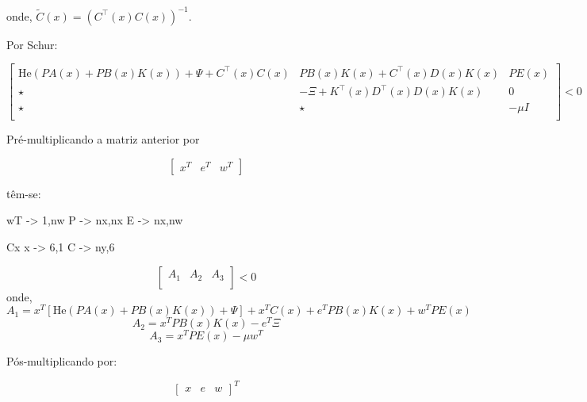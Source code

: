 onde, $\tilde C(x) = (C^{\top}(x) C(x))^{-1}$.

Por Schur:


\begin{equation}
  \begin{bmatrix}
    \text{He}(PA(x) + PB(x)K(x)) + \Psi  + C^{\top}(x) C(x) & PB(x)K(x) +  C^{\top}(x) D(x) K(x)       & P E(x) \\
    \star                                                   & -\Xi + K^{\top}(x) D^{\top}(x) D(x) K(x) & 0      \\
    \star                                                   & \star                                    & -\mu I \\
  \end{bmatrix} < 0
\end{equation}

Pré-multiplicando a matriz anterior por

\begin{equation}
  \begin{bmatrix}
    x^T & e^T & w^T
  \end{bmatrix}
\end{equation}

têm-se:

wT -> 1,nw
P -> nx,nx
E -> nx,nw


Cx
x -> 6,1
C -> ny,6

\begin{equation}
  \begin{bmatrix}
    A_1 & A_2 & A_3 \\
  \end{bmatrix} < 0
\end{equation}
onde,
\begin{equation}
  A_1 = x^T \left[\text{He}(PA(x) + PB(x)K(x)) + \Psi\right]  + x^T C(x) + e^TPB(x)K(x) + w^TPE(x)
\end{equation}
\begin{equation}
  A_2 = x^TPB(x)K(x) - e^T\Xi
\end{equation}
\begin{equation}
  A_3 = x^TPE(x) - \mu w^T
\end{equation}

Pós-multiplicando por:

\begin{equation}
  \begin{bmatrix}
    x & e & w
  \end{bmatrix}^T
\end{equation}

